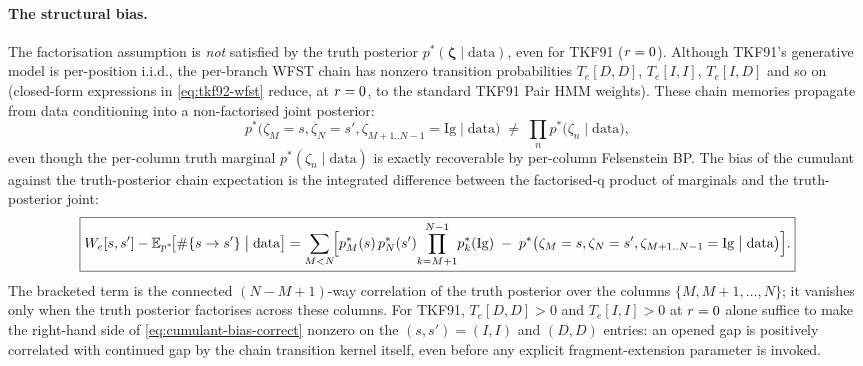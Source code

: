 \paragraph{The structural bias.}
The factorisation assumption is \emph{not} satisfied by the truth
posterior $p^*(\boldsymbol{\zeta} \mid \text{data})$, even for TKF91
($r = 0$).  Although TKF91's generative model is per-position
i.i.d., the per-branch WFST chain has nonzero transition
probabilities $T_e[D, D]$, $T_e[I, I]$, $T_e[I, D]$ and so on
(closed-form expressions in \eqref{eq:tkf92-wfst} reduce, at
$r = 0$, to the standard TKF91 Pair HMM weights).  These
chain memories propagate from data conditioning into a
non-factorised joint posterior:
\begin{equation}
p^*\bigl(\zeta_M = s, \zeta_N = s', \zeta_{M+1..N-1} = \mathrm{Ig}
   \mid \text{data}\bigr)
\;\neq\;
\prod_n p^*\bigl(\zeta_n \mid \text{data}\bigr),
\end{equation}
even though the per-column truth marginal $p^*(\zeta_n \mid
\text{data})$ is exactly recoverable by per-column Felsenstein
BP.  The bias of the cumulant against the truth-posterior chain
expectation is the integrated difference between the factorised-q
product of marginals and the truth-posterior joint:
\begin{equation}
\label{eq:cumulant-bias-correct}
\boxed{
W_e[s, s'] - \mathbb{E}_{p^*}\!\bigl[\#\{s \to s'\} \bigm| \text{data}\bigr]
= \sum_{M < N}\!\Bigl[ p^*_M(s)\,p^*_N(s')\!
   \prod_{k=M+1}^{N-1}\! p^*_k(\mathrm{Ig})
\;-\; p^*\bigl(\zeta_M=s, \zeta_N=s', \zeta_{M+1..N-1}=\mathrm{Ig}
   \bigm| \text{data}\bigr) \Bigr].
}
\end{equation}
The bracketed term is the connected $(N-M+1)$-way correlation of
the truth posterior over the columns $\{M, M+1, \dots, N\}$; it
vanishes only when the truth posterior factorises across these
columns.  For TKF91, $T_e[D,D] > 0$ and $T_e[I,I] > 0$ at
$r = 0$ alone suffice to make the right-hand side of
\eqref{eq:cumulant-bias-correct} nonzero on the $(s, s') = (I, I)$
and $(D, D)$ entries: an opened gap is positively correlated with
continued gap by the chain transition kernel itself, even before
any explicit fragment-extension parameter is invoked.

